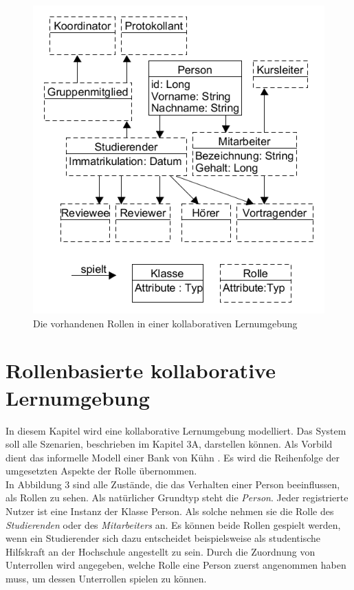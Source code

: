 \documentclass[conference]{IEEEtran}
\begin{document}
\begin{figure}
\centering
\includegraphics[scale=0.4]{Images/collabLearningBehavorial.PNG}
\caption{Die vorhandenen Rollen in einer kollaborativen Lernumgebung}
\end{figure}
\section{Rollenbasierte kollaborative Lernumgebung}
In diesem Kapitel wird eine kollaborative Lernumgebung modelliert. Das System soll alle Szenarien, beschrieben im Kapitel 3A, darstellen können. Als Vorbild dient das informelle Modell einer Bank von Kühn \cite{family}. Es wird die Reihenfolge der umgesetzten Aspekte der Rolle übernommen. \\In Abbildung 3 sind alle Zustände, die das Verhalten einer Person beeinflussen, als Rollen zu sehen. Als natürlicher Grundtyp steht die \textit{Person}. Jeder registrierte Nutzer ist eine Instanz der Klasse Person. Als solche nehmen sie die Rolle des \textit{Studierenden} oder des \textit{Mitarbeiters} an. Es können beide Rollen gespielt werden, wenn ein Studierender sich dazu entscheidet beispielsweise als studentische Hilfskraft an der Hochschule angestellt zu sein. Durch die Zuordnung von Unterrollen wird angegeben, welche Rolle eine Person zuerst angenommen haben muss, um dessen Unterrollen spielen zu können. \\ 
\end{document}
